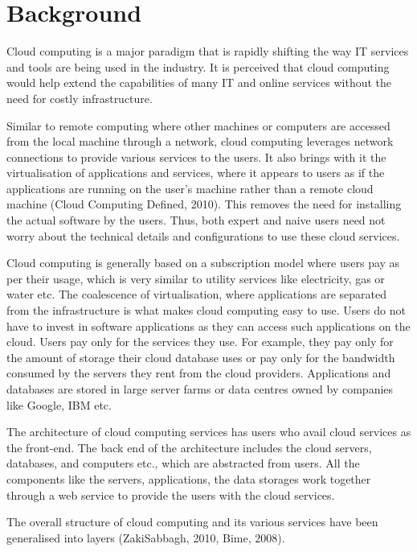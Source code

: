 \chapter{Background} \label{c:background}

Cloud computing is a major paradigm that is rapidly shifting the way \ac{IT}
services and tools are being used in the industry. It is perceived that cloud
computing would help extend the capabilities of many \ac{IT} and online services
without the need for costly infrastructure.

Similar to remote computing where other machines or computers are accessed from
the local machine through a network, cloud computing leverages network
connections to provide various services to the users. It also brings with it the
virtualisation of applications and services, where it appears to users as if the
applications are running on the user's machine rather than a remote cloud
machine (Cloud Computing Defined, 2010). This removes the need for installing
the actual software by the users. Thus, both expert and naive users need not
worry about the technical details and configurations to use these cloud
services.

Cloud computing is generally based on a subscription model where users pay as
per their usage, which is very similar to utility services like electricity, gas
or water etc. The coalescence of virtualisation, where applications are
separated from the infrastructure is what makes cloud computing easy to use.
Users do not have to invest in software applications as they can access such
applications on the cloud. Users pay only for the services they use. For
example, they pay only for the amount of storage their cloud database uses or
pay only for the bandwidth consumed by the servers they rent from the cloud
providers. Applications and databases are stored in large server farms or data
centres owned by companies like Google, IBM etc.

The architecture of cloud computing services has users who avail cloud services
as the front-end. The back end of the architecture includes the cloud servers,
databases, and computers etc., which are abstracted from users. All the
components like the servers, applications, the data storages work together
through a web service to provide the users with the cloud services.

The overall structure of cloud computing and its various services have been
generalised into layers (ZakiSabbagh, 2010, Bime, 2008).

